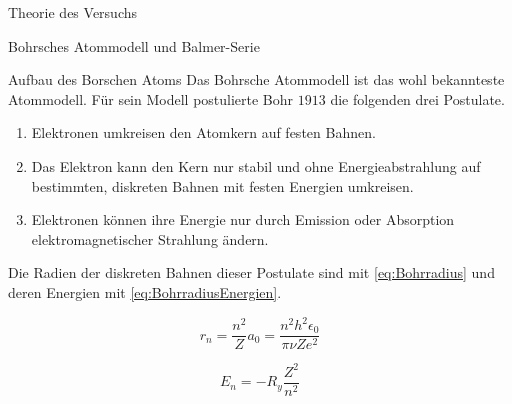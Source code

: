 \documentclass[pdftex, a4paper,11pt, twoside, ngerman]{report}
\begin{document}
\begin{chapter}{Theorie des Versuchs}
    
    
    \begin{section}{Bohrsches Atommodell und Balmer-Serie}
      \label{chp:TheorieBohrBalmerSerie}
      
      
      
      \begin{subsection}{Aufbau des Borschen Atoms}
	\label{chp:TheorieBohrBalmerSerieAufbauAtomhuelle}
	Das Bohrsche Atommodell ist das wohl bekannteste Atommodell. Für sein Modell postulierte Bohr $1913$ die folgenden drei Postulate.
	\begin{enumerate}
	  \item Elektronen umkreisen den Atomkern auf festen Bahnen.
	  \item Das Elektron kann den Kern nur stabil und ohne Energieabstrahlung auf bestimmten, diskreten Bahnen mit festen Energien umkreisen.
	  \item Elektronen können ihre Energie nur durch Emission oder Absorption elektromagnetischer Strahlung ändern.
	\end{enumerate}
	Die Radien der diskreten Bahnen dieser Postulate sind mit \cref{eq:Bohrradius} und deren Energien mit \cref{eq:BohrradiusEnergien}.
	\newline
	\begin{minipage}{.48\textwidth}
	  \begin{equation}
	    \label{eq:Bohrradius}
	    r_{n}=\frac{n^{2}}{Z}a_{0}=\frac{n^{2}h^{2}\epsilon_{0}}{\pi\nu Ze^{2}}
	  \end{equation}
	\end{minipage}
	\begin{minipage}{.48\textwidth}
	  \begin{equation}
	    \label{eq:BohrradiusEnergien}
	    E_{n}=-R_{y}\frac{Z^{2}}{n^{2}}
	  \end{equation}
	\end{minipage}
	

\end{subsection}
\end{section}
\end{chapter}
\end{document}
